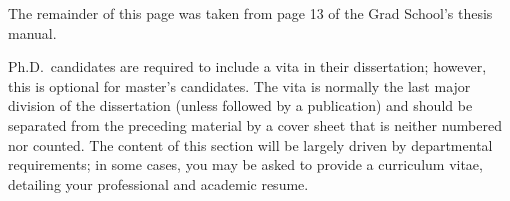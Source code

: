 %
%
%

\begin{vita}
  The remainder
  of this page was taken from page 13
  of the Grad School's thesis manual.

  Ph.D.~candidates are required to include a vita in their dissertation;
  however,
  this is optional for master's candidates.
  The vita is normally the last major division
  of the dissertation
  (unless followed by a publication)
  and should be separated from the preceding material
  by a cover sheet that is neither numbered nor counted.
  The content of this section will be largely driven
  by departmental requirements;
  in some cases,
  you may be asked to provide a curriculum vitae,
  detailing your professional and academic resume.
\end{vita}
